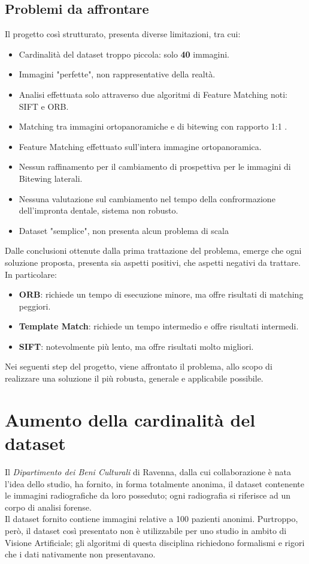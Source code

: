 \documentclass[12pt,a4paper,openright,twoside]{book}
\begin{document}
\section{Problemi da affrontare}
Il progetto così strutturato, presenta diverse limitazioni, tra cui:
\begin{itemize}
\item Cardinalità del dataset troppo piccola: solo \textbf{40} immagini.
\item Immagini "perfette", non rappresentative della realtà.
\item Analisi effettuata solo attraverso due algoritmi di Feature Matching noti: SIFT e ORB.
\item Matching tra  immagini ortopanoramiche e di bitewing con rapporto 1:1 .
\item Feature Matching effettuato sull'intera immagine ortopanoramica.
\item Nessun raffinamento per il cambiamento di prospettiva per le immagini di Bitewing laterali.
\item Nessuna valutazione sul cambiamento nel tempo della confrormazione dell'impronta dentale, sistema non robusto.
\item Dataset  "semplice", non presenta alcun problema di scala
\end{itemize}
Dalle conclusioni ottenute dalla prima trattazione del problema, emerge che ogni soluzione proposta, presenta sia aspetti positivi, che aspetti negativi da trattare. In particolare:
\begin{itemize}
\item \textbf{ORB}: richiede un tempo di esecuzione minore, ma offre risultati di matching peggiori.
\item \textbf{Template Match}: richiede un tempo intermedio e offre risultati intermedi.
\item \textbf{SIFT}: notevolmente più lento, ma offre risultati molto migliori.
\end{itemize}
Nei seguenti step del progetto, viene affrontato il problema, allo scopo di realizzare una soluzione il più robusta, generale e applicabile possibile.


\chapter{Aumento della cardinalità del dataset}
Il {\itshape Dipartimento dei Beni Culturali} di Ravenna, dalla cui collaborazione è nata l'idea dello studio, ha fornito, in forma totalmente anonima, il dataset contenente le immagini radiografiche da loro posseduto; ogni radiografia si riferisce ad un corpo di analisi forense. \\
Il dataset fornito contiene immagini relative a 100 pazienti anonimi. Purtroppo, però, il dataset così presentato non è utilizzabile per uno studio in ambito di Visione Artificiale; gli algoritmi di questa disciplina richiedono formalismi e rigori che i dati nativamente non presentavano.\\
\end{document}
